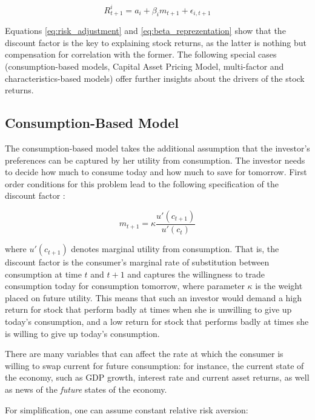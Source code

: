  		\begin{equation}
 		R_{t+1}^i = a_i + \beta_{i}m_{t+1} + \epsilon_{i,t+1}
 		\end{equation} 
 		
 		Equations \ref{eq:risk_adjustment} and \ref{eq:beta_reprezentation} show that the discount factor is the key to explaining stock returns, as the latter is nothing but compensation for correlation with the former. The following special cases (consumption-based models, Capital Asset Pricing Model, multi-factor and characteristics-based models) offer further insights about the drivers of the stock returns.    
 			 	
	 	\subsection{Consumption-Based Model}
	 	
		 	The consumption-based model takes the additional assumption that the investor's preferences can be captured by her utility from consumption. The investor needs to decide how much to consume today and how much to save for tomorrow. First order conditions for this problem lead to the following specification of the discount factor \cite{cochrane2009asset}: 
		 	
		 	\begin{equation}
		 		m_{t+1} = \kappa \frac{u'(c_{t+1})}{u'(c_t)} \label{consumtion_based_model}
		 	\end{equation}
		 	
		 	where $u'(c_{t+1})$ denotes marginal utility from consumption. That is, the discount factor is the consumer's  marginal rate of substitution between consumption at time $t$ and $t+1$ and captures the willingness to trade consumption today for consumption tomorrow, where parameter $\kappa$ is the weight placed on future utility.  This means that such an investor would demand a high return for stock that perform badly at times when she is unwilling to give up today's consumption, and a low return for stock that performs badly at times she is willing to give up today's consumption. 
		 	
		 	There are many variables that can affect the rate at which the consumer is willing to swap current for future consumption: for instance, the current state of the economy, such as GDP growth, interest rate and current asset returns, as well as news of the \textit{future} states of the economy. 
		 	
		 	For simplification, one can assume constant relative risk aversion:
		 	

